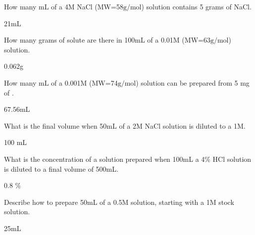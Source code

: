 \documentclass[main.tex]{subfiles}
\begin{document}
\begin{multicols*}{2}
\begin{question}[ID=\the\value{numA}]
How many mL of a 4M NaCl (MW=58$\text{g/mol}$) solution contains 5 grams of NaCl.
\end{question}\begin{solution}
21mL
 \hspace{0.1cm}\end{solution}
\begin{question}[ID=\the\value{numA}]
How many grams of solute are there in 100mL of a 0.01M  (MW=63$\text{g/mol}$) solution.
\end{question}\begin{solution}
0.062g
 \hspace{0.1cm}\end{solution}
\begin{question}[ID=\the\value{numA}]
How many mL of a 0.001M  (MW=74$\text{g/mol}$) solution can be prepared from 5 mg of .
\end{question}\begin{solution}
67.56mL
 \hspace{0.1cm}\end{solution}
\begin{question}[ID=\the\value{numA}]
What is the final volume when 50mL of a 2M NaCl solution is diluted to a 1M.
\end{question}\begin{solution}
100 mL
 \hspace{0.1cm}\end{solution}
\begin{question}[ID=\the\value{numA}]
What is the concentration of a solution prepared when 100mL a 4\% HCl solution is diluted to a final volume of 500mL.
\end{question}\begin{solution}
0.8 \%
 \hspace{0.1cm}\end{solution}
\begin{question}[ID=\the\value{numA}]
Describe how to prepare 50mL of a 0.5M  solution, starting with a 1M stock  solution.
\end{question}\begin{solution}
25mL
 \hspace{0.1cm}\end{solution}


\end{multicols*}
\end{document}
